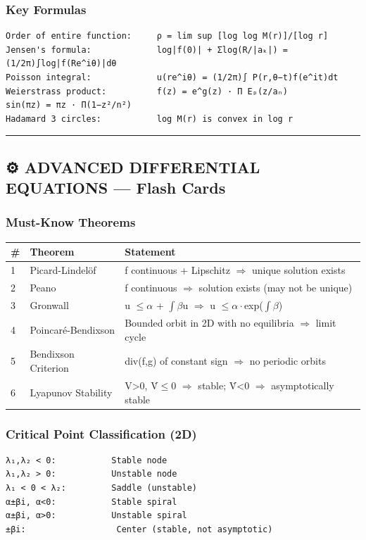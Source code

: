 \documentclass[12pt,a4paper,openany]{book}
\begin{document}
{{\subsubsection{Key Formulas}
\begin{verbatim}
Order of entire function:     ρ = lim sup [log log M(r)]/[log r]
Jensen's formula:             log|f(0)| + Σlog(R/|aₖ|) = (1/2π)∫log|f(Re^iθ)|dθ
Poisson integral:             u(re^iθ) = (1/2π)∫ P(r,θ−t)f(e^it)dt
Weierstrass product:          f(z) = e^g(z) · Π Eₚ(z/aₙ)
sin(πz) = πz · Π(1−z²/n²)
Hadamard 3 circles:           log M(r) is convex in log r
\end{verbatim}

\bigskip\noindent\rule{\textwidth}{0.4pt}\bigskip

\subsection{⚙️ ADVANCED DIFFERENTIAL EQUATIONS — Flash Cards}

\subsubsection{Must-Know Theorems}
\begin{center}
\begin{tabular}{|l|l|l|}
\hline
\textbf{#} & \textbf{Theorem} & \textbf{Statement} \\
\hline
1 & Picard-Lindelöf & f continuous + Lipschitz $\Longrightarrow$ unique solution exists \\
\hline
2 & Peano & f continuous $\Longrightarrow$ solution exists (may not be unique) \\
\hline
3 & Gronwall & u $\leq\alpha$ + $\int\beta$u $\Longrightarrow$ u $\leq\alpha\cdot$exp($\int\beta$) \\
\hline
4 & Poincaré-Bendixson & Bounded orbit in 2D with no equilibria $\Longrightarrow$ limit cycle \\
\hline
5 & Bendixson Criterion & div(f,g) of constant sign $\Longrightarrow$ no periodic orbits \\
\hline
6 & Lyapunov Stability & V>0, V̇$\leq$0 $\Longrightarrow$ stable; V̇<0 $\Longrightarrow$ asymptotically stable \\
\hline
\end{tabular}
\end{center}

\subsubsection{Critical Point Classification (2D)}
\begin{verbatim}
λ₁,λ₂ < 0:           Stable node
λ₁,λ₂ > 0:           Unstable node
λ₁ < 0 < λ₂:         Saddle (unstable)
α±βi, α<0:           Stable spiral
α±βi, α>0:           Unstable spiral
±βi:                  Center (stable, not asymptotic)
\end{verbatim}

}}
\end{document}
